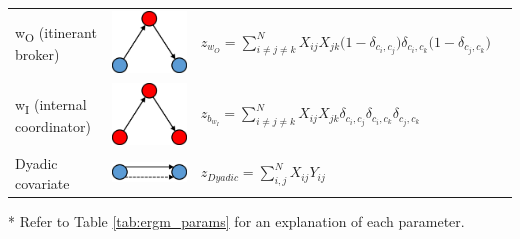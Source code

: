 \begin{table}
{\begin{threeparttable}
\begin{tabular}{l c l l}
w\textsubscript{O} (itinerant broker) & \begin{minipage}{.12\textwidth} \centering \includegraphics[width=0.4\linewidth]{Images/w_O} \end{minipage} & $z_{w_O} = \sum_{i \neq j \neq k}^N X_{ij} X_{jk} \bigg(1 - \delta_{c_i,c_j} \bigg) \delta_{c_i,c_k} \bigg(1 - \delta_{c_j,c_k} \bigg)$ & \\
w\textsubscript{I} (internal coordinator) & \begin{minipage}{.12\textwidth} \centering \includegraphics[width=0.4\linewidth]{Images/w_I} \end{minipage} & $z_{b_{w_I}} = \sum_{i \neq j \neq k}^N X_{ij} X_{jk} \delta_{c_i,c_j} \delta_{c_i,c_k} \delta_{c_j,c_k}$ & \\
Dyadic covariate & \begin{minipage}{.12\textwidth} \centering \includegraphics[width=0.4\linewidth]{Images/DyadicCovariate} \end{minipage} & $z_{Dyadic} = \sum_{i,j}^N X_{ij} Y_{ij}$ & \\
\bottomrule
\end{tabular}
\begin{tablenotes}
\footnotesize
\item[*] Refer to Table \ref{tab:ergm_params} for an explanation of each parameter.
\end{tablenotes}

\end{threeparttable}
}
\end{table}